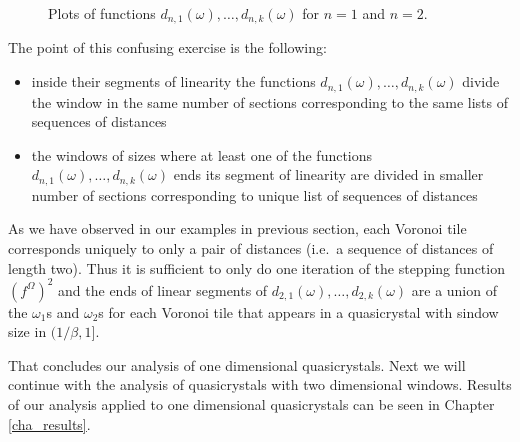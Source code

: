 \documentclass[text.tex]{subfiles}
\begin{document}
\begin{figure}[h!]
\caption{Plots of functions $d_{n,1}(\omega),\dots, d_{n,k}(\omega)$ for $n=1$ and $n=2$. }
\label{fig_steppingFunctionDiscontinuityFunctions}
\end{figure}


The point of this confusing exercise is the following: 
\begin{itemize}
\item inside their segments of linearity the functions $d_{n,1}(\omega),\dots, d_{n,k}(\omega)$ divide the window in the same number of sections corresponding to the same lists of sequences of distances 
\item the windows of sizes where at least one of the functions $d_{n,1}(\omega),\dots, d_{n,k}(\omega)$ ends its segment of linearity are divided in smaller number of sections corresponding to unique list of sequences of distances
\end{itemize} 

As we have observed in our examples in previous section, each Voronoi tile corresponds uniquely to only a pair of distances (i.e.\ a sequence of distances of length two). Thus it is sufficient to only do one iteration of the stepping function $(f^\Omega)^2$ and the ends of linear segments of $d_{2,1}(\omega),\dots, d_{2,k}(\omega)$ are a union of the $\omega_1$s and $\omega_2$s for each Voronoi tile that appears in a quasicrystal with sindow size in $(1/\beta,1]$. 

That concludes our analysis of one dimensional quasicrystals. Next we will continue with the analysis of quasicrystals with two dimensional windows. Results of our analysis applied to one dimensional quasicrystals can be seen in Chapter \ref{cha_results}. 
\end{document}

